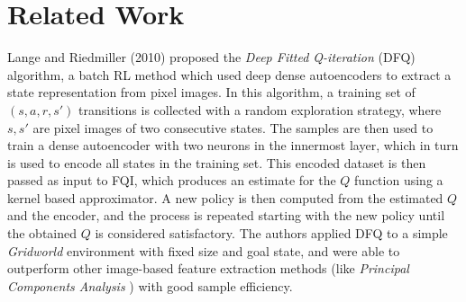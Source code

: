\section{Related Work}
Lange and Riedmiller (2010) \cite{lange2010deep} proposed the \textit{Deep 
Fitted Q-iteration} (DFQ) algorithm, a batch RL method which used deep dense 
autoencoders to extract a state representation from pixel images. 
In this algorithm, a training set of $(s, a, r, s')$ transitions is collected
with a random exploration strategy, where $s, s'$ are pixel images of two 
consecutive states. The samples are then used to train a dense autoencoder with 
two neurons in the innermost layer, which in turn is used to encode all states 
in the training set. This encoded dataset is then passed as input to FQI, 
which produces an estimate for the $Q$ function using a kernel based 
approximator. A new policy is then computed from the estimated $Q$ and the 
encoder, and the process is repeated starting with the new policy until the 
obtained $Q$ is considered satisfactory.
The authors applied DFQ to a simple \textit{Gridworld} environment with fixed 
size and goal state, and were able to outperform other image-based feature
extraction methods (like \textit{Principal Components Analysis} 
\cite{wold1987principal}) with good sample efficiency.



























